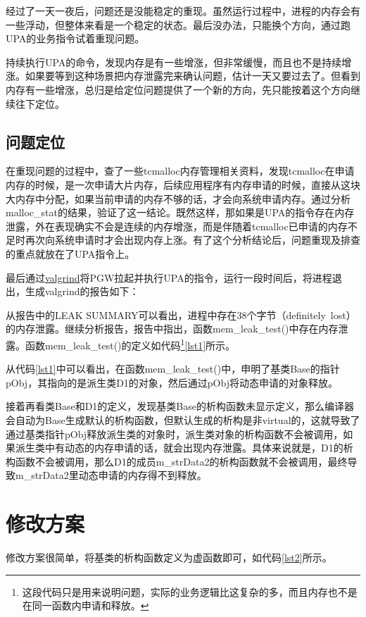 \documentclass[a4paper, 11pt, titlepage]{article}
\begin{document}
经过了一天一夜后，问题还是没能稳定的重现。虽然运行过程中，进程的内存会有一些浮动，但整体来看是一个稳定的状态。最后没办法，只能换个方向，通过跑UPA的业务指令试着重现问题。

持续执行UPA的命令，发现内存是有一些增涨，但非常缓慢，而且也不是持续增涨。如果要等到这种场景把内存泄露完来确认问题，估计一天又要过去了。但看到内存有一些增涨，总归是给定位问题提供了一个新的方向，先只能按着这个方向继续往下定位。

\subsection{问题定位}
在重现问题的过程中，查了一些tcmalloc内存管理相关资料，发现tcmalloc在申请内存的时候，是一次申请大片内存，后续应用程序有内存申请的时候，直接从这块大内存中分配，如果当前申请的内存不够的话，才会向系统申请内存。通过分析malloc\_stat的结果，验证了这一结论。既然这样，那如果是UPA的指令存在内存泄露，外在表现确实不会是连续的内存增涨，而是伴随着tcmalloc已申请的内存不足时再次向系统申请时才会出现内存上涨。有了这个分析结论后，问题重现及排查的重点就放在了UPA指令上。

最后通过\href{http://valgrind.org/}{valgrind}将PGW拉起并执行UPA的指令，运行一段时间后，将进程退出，生成valgrind的报告如下：


从报告中的{\color{blue}LEAK SUMMARY}可以看出，进程中存在38个字节（definitely\ lost）的内存泄露。继续分析报告，报告中指出，函数mem\_leak\_test()中存在内存泄露。函数mem\_leak\_test()的定义如代码\footnote{这段代码只是用来说明问题，实际的业务逻辑比这复杂的多，而且内存也不是在同一函数内申请和释放。}\ref{lst1}所示。


从代码\ref{lst1}中可以看出，在函数mem\_leak\_test()中，申明了基类Base的指针pObj，其指向的是派生类D1的对象，然后通过pObj将动态申请的对象释放。

接着再看类Base和D1的定义，发现基类Base的析构函数未显示定义，那么编译器会自动为Base生成默认的析构函数，但默认生成的析构是非virtual的，这就导致了通过基类指针pObj释放派生类的对象时，派生类对象的析构函数不会被调用，如果派生类中有动态的内存申请的话，就会出现内存泄露。具体来说就是，D1的析构函数不会被调用，那么D1的成员m\_strData2的析构函数就不会被调用，最终导致m\_strData2里动态申请的内存得不到释放。

\section{修改方案}
修改方案很简单，将基类的析构函数定义为虚函数即可，如代码\ref{lst2}所示。

\end{document}
